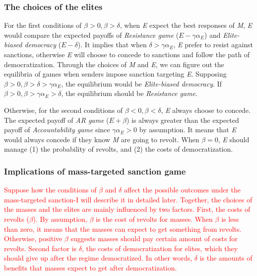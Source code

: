 \documentclass[11pt]{article}
\begin{document}
\subsubsection*{The choices of the elites}
	
For the first conditions of $\beta > 0, \beta > \delta$, when \textit{E} expect the best responses of \textit{M}, \textit{E} would compare the expected payoffs of \textit{Resistance game} ($E-\gamma\alpha_{E}$) and \textit{Elite-biased democracy} ($E-\delta$). It implies that when $\delta > \gamma\alpha_{E}$, \textit{E} prefer to resist against sanctions, otherwise \textit{E} will choose to concede to sanctions and follow the path of democratization. Through the choices of \textit{M} and \textit{E}, we can figure out the equilibria of games when senders impose sanction targeting \textit{E}. Supposing $\beta > 0, \beta > \delta > \gamma\alpha_{E}$, the equilibrium would be \textit{Elite-biased democracy}. If $\beta > 0, \beta > \gamma\alpha_{E} > \delta$, the equilibrium should be \textit{Resistance game}.
	
Otherwise, for the second conditions of $\beta <0, \beta < \delta$, \textit{E} always choose to concede. The expected payoff of \textit{AR game} ($E + \beta$) is always greater than the expected payoff of \textit{Accountability game} since $\gamma\alpha_{E} > 0$ by assumption. It means that \textit{E} would always concede if they know \textit{M} are going to revolt. When $\beta = 0$, \textit{E} should manage (1) the probability of revolts, and (2) the costs of democratization.
	
\subsubsection*{Implications of mass-targeted sanction game}

\textcolor{red}{Suppose how the conditions of $\beta$ and $\delta$ affect the possible outcomes under the mass-targeted sanction-I will describe it in detailed later.	Together, the choices of the masses and the elites are mainly influenced by two factors. First, the costs of revolts ($\beta$). By assumption, $\beta$ is the cost of revolts for masses. When $\beta$ is less than zero, it means that the masses can expect to get something from revolts. Otherwise, positive $\beta$ suggests masses should pay certain amount of costs for revolts. Second factor is $\delta$, the costs of democratization for elites, which they should give up after the regime democratized. In other words, $\delta$ is the amounts of benefits that masses expect to get after democratization.}
\end{document}
